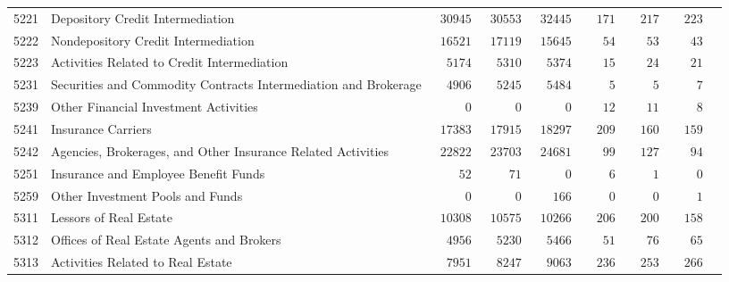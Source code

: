 \documentclass[9pt, oneside]{article}   	%
\begin{document}
\begin{longtable}{lp{3 in}ccccccc}
5221  & Depository Credit Intermediation & $\phantom{0}30945$ & $\phantom{0}30553$ & $\phantom{0}32445$ & $\phantom{00}171$ & $\phantom{00}217$ & $\phantom{00}223$ \\
5222  & Nondepository Credit Intermediation & $\phantom{0}16521$ & $\phantom{0}17119$ & $\phantom{0}15645$ & $\phantom{000}54$ & $\phantom{000}53$ & $\phantom{000}43$ \\
5223  & Activities Related to Credit Intermediation & $\phantom{00}5174$ & $\phantom{00}5310$ & $\phantom{00}5374$ & $\phantom{000}15$ & $\phantom{000}24$ & $\phantom{000}21$ \\
5231  & Securities and Commodity Contracts Intermediation and Brokerage & $\phantom{00}4906$ & $\phantom{00}5245$ & $\phantom{00}5484$ & $\phantom{0000}5$ & $\phantom{0000}5$ & $\phantom{0000}7$ \\
5239  & Other Financial Investment Activities & $\phantom{00000}0$ & $\phantom{00000}0$ & $\phantom{00000}0$ & $\phantom{000}12$ & $\phantom{000}11$ & $\phantom{0000}8$ \\
5241  & Insurance Carriers & $\phantom{0}17383$ & $\phantom{0}17915$ & $\phantom{0}18297$ & $\phantom{00}209$ & $\phantom{00}160$ & $\phantom{00}159$ \\
5242  & Agencies, Brokerages, and Other Insurance Related Activities & $\phantom{0}22822$ & $\phantom{0}23703$ & $\phantom{0}24681$ & $\phantom{000}99$ & $\phantom{00}127$ & $\phantom{000}94$ \\
5251  & Insurance and Employee Benefit Funds & $\phantom{0000}52$ & $\phantom{0000}71$ & $\phantom{00000}0$ & $\phantom{0000}6$ & $\phantom{0000}1$ & $\phantom{0000}0$ \\
5259  & Other Investment Pools and Funds & $\phantom{00000}0$ & $\phantom{00000}0$ & $\phantom{000}166$ & $\phantom{0000}0$ & $\phantom{0000}0$ & $\phantom{0000}1$ \\

5311  & Lessors of Real Estate & $\phantom{0}10308$ & $\phantom{0}10575$ & $\phantom{0}10266$ & $\phantom{00}206$ & $\phantom{00}200$ & $\phantom{00}158$ \\
5312  & Offices of Real Estate Agents and Brokers & $\phantom{00}4956$ & $\phantom{00}5230$ & $\phantom{00}5466$ & $\phantom{000}51$ & $\phantom{000}76$ & $\phantom{000}65$ \\
5313  & Activities Related to Real Estate & $\phantom{00}7951$ & $\phantom{00}8247$ & $\phantom{00}9063$ & $\phantom{00}236$ & $\phantom{00}253$ & $\phantom{00}266$ \\


\end{longtable}
\end{document}
